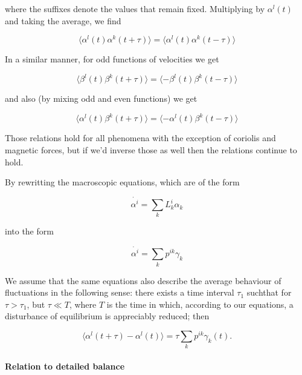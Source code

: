 \documentclass[a4paper,12pt,nofootinbib]{article}
\begin{document}
where the suffixes denote the values that remain fixed. Multiplying by $\alpha^l(t)$ and taking the average, we find

\begin{equation}
  \langle \alpha^l(t) \alpha^k (t+\tau) \rangle = \langle \alpha^l(t) \alpha^k(t-\tau) \rangle
\end{equation}

In a similar manner, for odd functions of velocities we get

\begin{equation}
  \langle \beta^l(t) \beta^k (t+\tau) \rangle = \langle - \beta^l(t) \beta^k(t-\tau) \rangle
\end{equation}

and also (by mixing odd and even functions) we get

\begin{equation}
  \langle \alpha^l(t) \beta^k (t+\tau) \rangle = \langle - \alpha^l(t) \beta^k(t-\tau) \rangle
\end{equation}

Those relations hold for all phenomena with the exception of coriolis and magnetic forces, but if we'd inverse those as well then the relations continue to hold.

By rewritting the macroscopic equations, which are of the form

\begin{equation}
  \dot{\alpha^i}= \sum_k L_k^i \alpha_k
\end{equation}

into the form

\begin{equation}
  \dot{\alpha^i}= \sum_k p^{ik} \gamma_k
\end{equation}

We assume that the same equations also describe the average behaviour of fluctuations in the following sense: there exists a time interval $\tau_1$ suchthat for $\tau > \tau_1$, but $\tau \ll T$, where $T$ is the time in which, according to our equations, a disturbance of equilibrium is appreciably reduced; then

\begin{equation}
    \langle \alpha^l(t+\tau)- \alpha^l (t) \rangle = \tau \sum_k p^{ik} \gamma_k(t).
\end{equation}
		

\paragraph{Relation to detailed balance}
\end{document}

